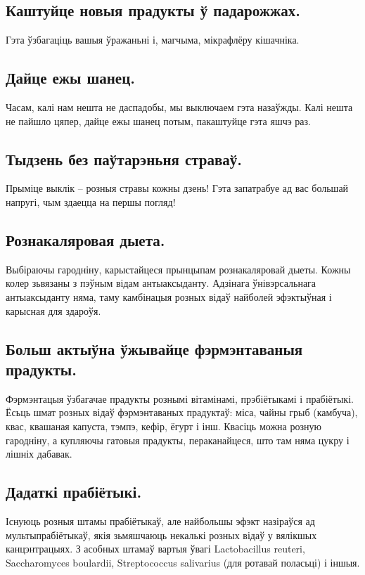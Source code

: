 \subsection{Каштуйце новыя прадукты ў падарожжах.}
Гэта ўзбагаціць вашыя ўражаньні і, магчыма, мікрафлёру кішачніка.

\subsection{Дайце ежы шанец.}
Часам, калі нам нешта не даспадобы, мы выключаем гэта назаўжды. Калі нешта не пайшло цяпер, дайце ежы шанец потым, пакаштуйце гэта яшчэ раз.

\subsection{Тыдзень без паўтарэньня страваў.}
Прыміце выклік – розныя стравы кожны дзень! Гэта запатрабуе ад вас большай напругі, чым здаецца на першы погляд!

\subsection{Рознакаляровая дыета.}
Выбіраючы гародніну, карыстайцеся прынцыпам рознакаляровай дыеты. Кожны колер зьвязаны з пэўным відам антыаксыданту. Адзінага ўнівэрсальнага антыаксыданту няма, таму камбінацыя розных відаў найболей эфэктыўная і карысная для здароўя.

\subsection{Больш актыўна ўжывайце фэрмэнтаваныя прадукты.}
Фэрмэнтацыя ўзбагачае прадукты рознымі вітамінамі, прэбіётыкамі і прабіётыкі. Ёсьць шмат розных відаў фэрмэнтаваных прадуктаў: міса, чайны грыб (камбуча), квас, квашаная капуста, тэмпэ, кефір, ёгурт і інш. Квасіць можна розную гародніну, а купляючы гатовыя прадукты, пераканайцеся, што там няма цукру і лішніх дабавак.

\subsection{Дадаткі прабіётыкі.}
Існуюць розныя штамы прабіётыкаў, але найбольшы эфэкт назіраўся ад мультыпрабіётыкаў, якія зьмяшчаюць некалькі розных відаў у вялікшых канцэнтрацыях. З асобных штамаў вартыя ўвагі Lactobacillus reuteri, Saccharomyces boulardii, Streptococcus salivarius (для ротавай поласьці) і іншыя.

